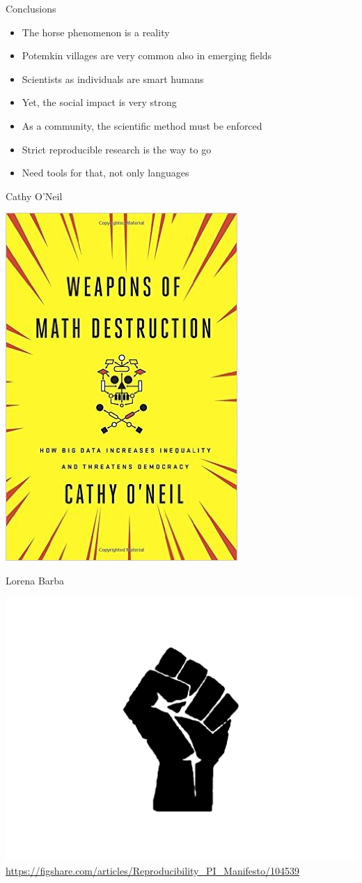 \documentclass[compress]{beamer}
\begin{document}
\begin{frame}{Conclusions}
\begin{itemize}
\item The horse phenomenon is a reality
\item Potemkin villages are very common also in emerging fields
\item Scientists as individuals are smart humans
\item Yet, the social impact is very strong
\item As a community, the scientific method must be enforced
\item Strict reproducible research is the way to go
\item Need tools for that, not only languages
\end{itemize}
\end{frame}

\begin{frame}{Cathy O'Neil}
\begin{center}
\includegraphics[width=.4\columnwidth]{figures/maths}
\end{center}
\end{frame}

\begin{frame}{Lorena Barba}
\begin{center}
\includegraphics[width=.7\columnwidth]{figures/manifesto} \\
\url{https://figshare.com/articles/Reproducibility_PI_Manifesto/104539}
\end{center}
\end{frame}
\end{document}
